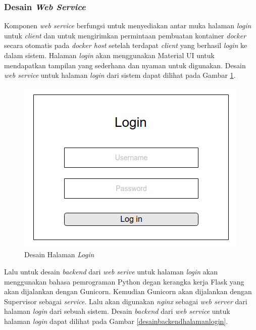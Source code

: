 \subsubsection{Desain \textit{Web Service}}
Komponen \textit{web service} berfungsi untuk menyediakan antar muka halaman \textit{login} untuk \textit{client} dan untuk mengirimkan permintaan pembuatan kontainer \textit{docker} secara otomatis pada \textit{docker host} setelah terdapat \textit{client} yang berhasil \textit{login} ke dalam sistem. Halaman \textit{login} akan menggunakan Material UI untuk mendapatkan tampilan yang sederhana dan nyaman untuk digunakan. Desain \textit{web service} untuk halaman \textit{login} dari sistem dapat dilihat pada Gambar \ref{mockuplogin}.

\begin{figure}[H]
	\centering
	\includegraphics[width=\linewidth]{images/bab3/MockupLogin}
	\caption{Desain Halaman \textit{Login}}
	\label{mockuplogin}
\end{figure}

Lalu untuk desain \textit{backend} dari \textit{web serive} untuk halaman \textit{login} akan menggunakan bahasa pemrograman Python degan kerangka kerja Flask yang akan dijalankan dengan Gunicorn. Kemudian Gunicorn akan dijalankan dengan Supervisor sebagai \textit{service}. Lalu akan digunakan \textit{nginx} sebagai \textit{web server} dari halaman \textit{login} dari sebuah sistem. Desain \textit{backend} dari \textit{web service} untuk halaman \textit{login} dapat dilihat pada Gambar \ref{desainbackendhalamanlogin}.

